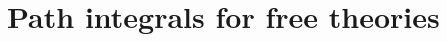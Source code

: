 \documentclass[12pt, oneside]{article}   	%
\theoremstyle{definition}
\begin{document}




	
	
	
	

\section*{Path integrals for free theories}
\end{document}
